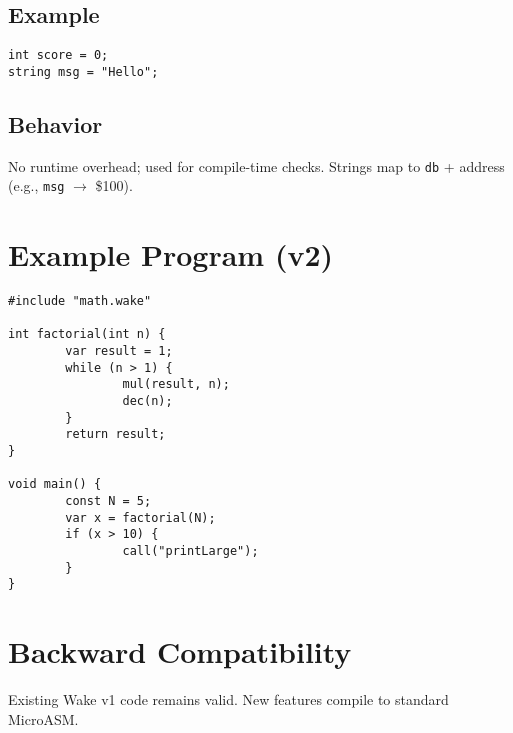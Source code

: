 \documentclass[a4paper,11pt]{book}
\begin{document}
\subsection*{Example}
\begin{lstlisting}[language=Wake]
int score = 0;
string msg = "Hello";
\end{lstlisting}

\subsection*{Behavior}
No runtime overhead; used for compile-time checks. Strings map to \texttt{db} + address (e.g., \texttt{msg} \(\rightarrow\) \$100).

\section{Example Program (v2)}
\begin{lstlisting}[language=Wake]
#include "math.wake"

int factorial(int n) {
		var result = 1;
		while (n > 1) {
				mul(result, n);
				dec(n);
		}
		return result;
}

void main() {
		const N = 5;
		var x = factorial(N);
		if (x > 10) {
				call("printLarge");
		}
}
\end{lstlisting}

\section{Backward Compatibility}
Existing Wake v1 code remains valid. New features compile to standard MicroASM.
\end{document}
